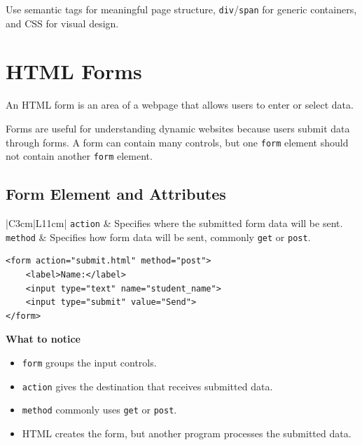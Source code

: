 \begin{summarybox}
Use semantic tags for meaningful page structure, \texttt{div}/\texttt{span} for generic containers, and CSS for visual design.
\end{summarybox}

\section{HTML Forms}

\begin{definitionbox}
An HTML form is an area of a webpage that allows users to enter or select data.
\end{definitionbox}

Forms are useful for understanding dynamic websites because users submit data through forms. A form can contain many controls, but one \texttt{form} element should not contain another \texttt{form} element.

\subsection{Form Element and Attributes}
\begin{longtable}{|C{3cm}|L{11cm}|}
\texttt{action} & Specifies where the submitted form data will be sent. \\ \tblhline
\texttt{method} & Specifies how form data will be sent, commonly \texttt{get} or \texttt{post}. \\ \tblhline
\tblbottomrule
\caption{Main attributes of the form tag}
\end{longtable}

\begin{lstlisting}[style=htmlide, caption={Basic Form Structure}]
<form action="submit.html" method="post">
    <label>Name:</label>
    <input type="text" name="student_name">
    <input type="submit" value="Send">
</form>
\end{lstlisting}

\textbf{What to notice}
\begin{itemize}
    \item \texttt{form} groups the input controls.
    \item \texttt{action} gives the destination that receives submitted data.
    \item \texttt{method} commonly uses \texttt{get} or \texttt{post}.
    \item HTML creates the form, but another program processes the submitted data.
\end{itemize}

